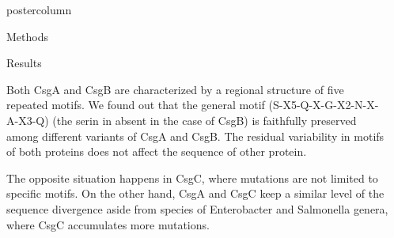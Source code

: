 \documentclass[final]{beamer}
\newlength{\columnheight}
\begin{document}
\begin{frame}
\begin{columns}
\begin{column}{.48\textwidth}
\begin{beamercolorbox}[center,wd=\textwidth]{postercolumn}
\begin{minipage}[T]{.95\textwidth}
{\begin{block}{Methods}
\end{block}


\begin{block}{Results}

Both CsgA and CsgB are characterized by a regional structure of five repeated motifs. We found out that the general motif (S-X5-Q-X-G-X2-N-X-A-X3-Q) (the serin in absent in the case of CsgB) is faithfully preserved among different variants of CsgA and CsgB. The residual variability in motifs of both proteins does not affect the sequence of other protein.

The opposite situation happens in CsgC, where mutations are not limited to specific motifs. On the other hand, CsgA and CsgC keep a similar level of the sequence divergence aside from species of Enterobacter and Salmonella genera, where CsgC accumulates more mutations.


\end{block}

\vfill

}
\end{minipage}
\end{beamercolorbox}
\end{column}



\begin{column}{.50\textwidth}
\end{column}
\end{columns}
\end{frame}
\end{document}
